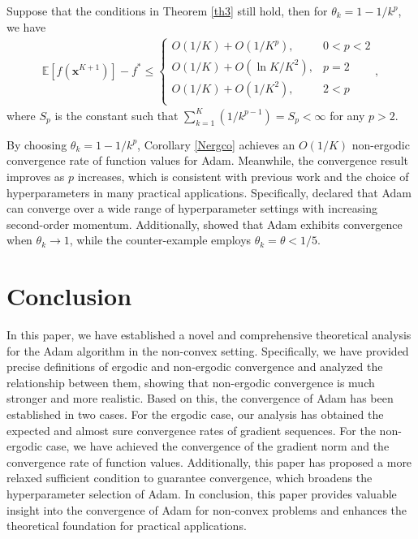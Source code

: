\documentclass[twoside,11pt]{article}
\begin{document}
	
\begin{corollary}\label{Nergco}
Suppose that the conditions in Theorem \ref{th3} still hold, then for $\theta_k=1-1/k^{p}$, we have
\begin{equation}
	\begin{aligned}
    	\mathbb{E}\left[ f(\mathbf{x}^{K+1})\right] -f^*
		\le
	\begin{cases}
	O({ 1 }/{K}) +O({1}/{K^p}), 
	& \text{$0<p< 2$}\\
	O({ 1 }/{K}) +O({\ln K}/{K^2}),
	& \text{$p=2$}\\
	O({ 1 }/{K}) +O({1}/{K^2}), 
	& \text{$2<p$}\\
	\end{cases},\nonumber
	\end{aligned}
\end{equation}
where $S_p$ is the constant such that $\sum_{k=1}^{K}(1/k^{p-1})=S_p<\infty$ for any $p>2$.
\end{corollary}
\par By choosing $\theta_{k}=1-1/k^{p}$, Corollary \ref{Nergco} achieves an $O(1/K)$ non-ergodic convergence rate of function values for Adam. Meanwhile, the convergence result improves as $p$ increases, which is consistent with previous work and the choice of hyperparameters in many practical applications. Specifically, \citet{zhang2022adam} declared that Adam can converge over a wide range of hyperparameter settings with increasing second-order momentum. Additionally, \citet{defossezsimple} showed that Adam exhibits convergence when $\theta_k\rightarrow 1$, while the counter-example  \citep[see][]{reddi2019convergence} employs $\theta_k=\theta<1/5$.

	
\section{Conclusion}\label{sec:conclusion}
In this paper, we have established a novel and comprehensive theoretical analysis for the Adam algorithm in the non-convex setting. Specifically, we have provided precise definitions of ergodic and non-ergodic convergence and analyzed the relationship between them, showing that non-ergodic convergence is much stronger and more realistic. Based on this, the convergence of Adam has been established in two cases. For the ergodic case, our analysis has obtained the expected and almost sure convergence rates of gradient sequences. For the non-ergodic case, we have achieved the convergence of the gradient norm and the convergence rate of function values. Additionally, this paper has proposed a more relaxed sufficient condition to guarantee convergence, which broadens the hyperparameter selection of Adam. In conclusion, this paper provides valuable insight into the convergence of Adam for non-convex problems and enhances the theoretical foundation for practical applications.
\end{document}
